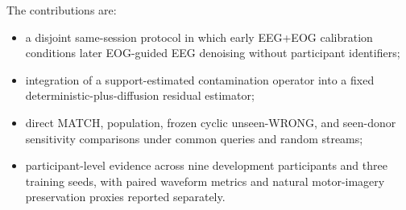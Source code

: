 The contributions are:
\begin{itemize}
  \item a disjoint same-session protocol in which early EEG+EOG calibration
  conditions later EOG-guided EEG denoising without participant identifiers;
  \item integration of a support-estimated contamination operator into a fixed
  deterministic-plus-diffusion residual estimator;
  \item direct MATCH, population, frozen cyclic unseen-WRONG, and seen-donor
  sensitivity comparisons under common queries and random streams;
  \item participant-level evidence across nine development participants and
  three training seeds, with paired waveform metrics and natural motor-imagery
  preservation proxies reported separately.
\end{itemize}
